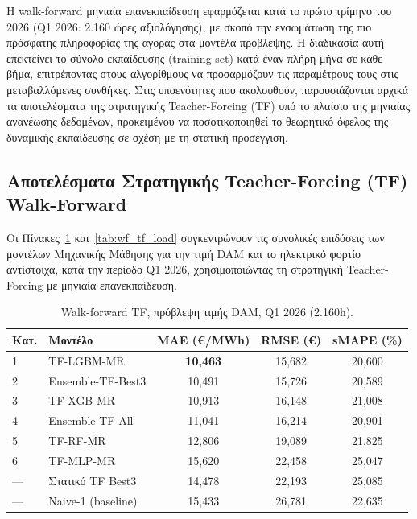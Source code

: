 Η walk-forward μηνιαία επανεκπαίδευση εφαρμόζεται κατά το πρώτο τρίμηνο του 2026 (Q1 2026: 2.160 ώρες αξιολόγησης), με σκοπό την ενσωμάτωση της πιο πρόσφατης πληροφορίας της αγοράς στα μοντέλα πρόβλεψης. Η διαδικασία αυτή επεκτείνει το σύνολο εκπαίδευσης (training set) κατά έναν πλήρη μήνα σε κάθε βήμα, επιτρέποντας στους αλγορίθμους να προσαρμόζουν τις παραμέτρους τους στις μεταβαλλόμενες συνθήκες. Στις υποενότητες που ακολουθούν, παρουσιάζονται αρχικά τα αποτελέσματα της στρατηγικής Teacher-Forcing (TF) υπό το πλαίσιο της μηνιαίας ανανέωσης δεδομένων, προκειμένου να ποσοτικοποιηθεί το θεωρητικό όφελος της δυναμικής εκπαίδευσης σε σχέση με τη στατική προσέγγιση.

\subsection{Αποτελέσματα Στρατηγικής Teacher-Forcing (TF) Walk-Forward}
\label{subsec:tf_wf_results}

Οι Πίνακες~\ref{tab:wf_tf_price} και~\ref{tab:wf_tf_load} συγκεντρώνουν τις συνολικές επιδόσεις των μοντέλων Μηχανικής Μάθησης για την τιμή DAM και το ηλεκτρικό φορτίο αντίστοιχα, κατά την περίοδο Q1 2026, χρησιμοποιώντας τη στρατηγική Teacher-Forcing με μηνιαία επανεκπαίδευση.

\begin{table}[H]
  \centering
  \caption{Walk-forward TF, πρόβλεψη τιμής DAM, Q1 2026 (2.160h).}
  \label{tab:wf_tf_price}
  \begin{tabular}{llccc}
    \toprule
    \textbf{Κατ.} & \textbf{Μοντέλο} & \textbf{MAE (€/MWh)} & \textbf{RMSE (€)} & \textbf{sMAPE (\%)} \\
    \midrule
    1   & TF-LGBM-MR          & \textbf{10,463} & 15,682 & 20,600 \\
    2   & Ensemble-TF-Best3   & 10,491          & 15,726 & 20,589 \\
    3   & TF-XGB-MR           & 10,913          & 16,148 & 21,008 \\
    4   & Ensemble-TF-All     & 11,041          & 16,214 & 20,901 \\
    5   & TF-RF-MR            & 12,806          & 19,089 & 21,825 \\
    6   & TF-MLP-MR           & 15,620          & 22,458 & 25,047 \\
    \midrule
    --- & Στατικό TF Best3    & 14,478          & 22,193 & 25,085 \\
    --- & Naive-1 (baseline)  & 15,433          & 26,781 & 22,635 \\
    \bottomrule
  \end{tabular}
\end{table}

